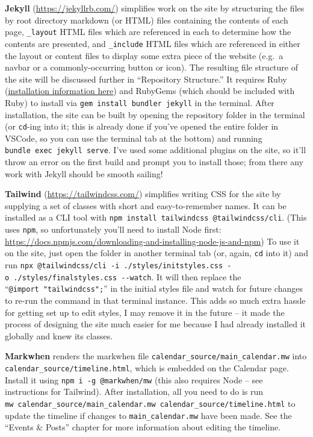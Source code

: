 \documentclass[
]{book}
\begin{document}
\textbf{Jekyll} (\url{https://jekyllrb.com/}) simplifies work on the site by structuring the files by root directory markdown (or HTML) files containing the contents of each page, \texttt{\_layout} HTML files which are referenced in each to determine how the contents are presented, and \texttt{\_include} HTML files which are referenced in either the layout or content files to display some extra piece of the website (e.g.~a navbar or a commonly-occurring button or icon). The resulting file structure of the site will be discussed further in ``Repository Structure.'' It requires Ruby (\href{https://www.ruby-lang.org/en/documentation/installation/}{installation information here}) and RubyGems (which should be included with Ruby) to install via \texttt{gem\ install\ bundler\ jekyll} in the terminal. After installation, the site can be built by opening the repository folder in the terminal (or \texttt{cd}-ing into it; this is already done if you've opened the entire folder in VSCode, so you can use the terminal tab at the bottom) and running \texttt{bundle\ exec\ jekyll\ serve}. I've used some additional plugins on the site, so it'll throw an error on the first build and prompt you to install those; from there any work with Jekyll should be smooth sailing!

\textbf{Tailwind} (\url{https://tailwindcss.com/}) simplifies writing CSS for the site by supplying a set of classes with short and easy-to-remember names. It can be installed as a CLI tool with \texttt{npm\ install\ tailwindcss\ @tailwindcss/cli}. (This uses \texttt{npm}, so unfortunately you'll need to install Node first: \url{https://docs.npmjs.com/downloading-and-installing-node-js-and-npm}) To use it on the site, just open the folder in another terminal tab (or, again, \texttt{cd} into it) and run \texttt{npx\ @tailwindcss/cli\ -i\ ./styles/initstyles.css\ -o\ ./styles/finalstyles.css\ -\/-watch}. It will then replace the ``\texttt{@import\ "tailwindcss";}'' in the initial styles file and watch for future changes to re-run the command in that terminal instance. This adds so much extra hassle for getting set up to edit styles, I may remove it in the future -- it made the process of designing the site much easier for me because I had already installed it globally and knew its classes.

\textbf{Markwhen} renders the markwhen file \texttt{calendar\_source/main\_calendar.mw} into \texttt{calendar\_source/timeline.html}, which is embedded on the Calendar page. Install it using \texttt{npm\ i\ -g\ @markwhen/mw} (this also requires Node -- see instructions for Tailwind). After installation, all you need to do is run \texttt{mw\ calendar\_source/main\_calendar.mw\ calendar\_source/timeline.html} to update the timeline if changes to \texttt{main\_calendar.mw} have been made. See the ``Events \& Posts'' chapter for more information about editing the timeline.
\end{document}
